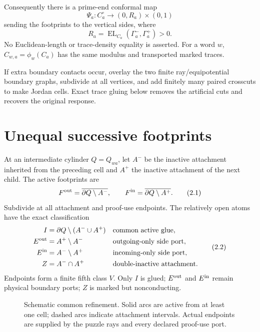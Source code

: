 \documentclass[11pt]{article}
\theoremstyle{definition}
\theoremstyle{remark}
\newcommand{\EL}{\operatorname{EL}}
\begin{document}
Consequently there is a prime-end conformal map
\[
 \Psi_a:C_a^\circ\longrightarrow(0,R_a)\times(0,1)
\]
sending the footprints to the vertical sides, where
\[
 R_a=\EL_{C_a}(\Gamma_a^-,\Gamma_a^+)>0.
 \tag{1.3}
\]
No Euclidean-length or trace-density equality is asserted.  For a word $w$,
$C_{w,a}=\phi_w(C_a)$ has the same modulus and transported marked traces.

If extra boundary contacts occur, overlay the two finite ray/equipotential
boundary graphs, subdivide at all vertices, and add finitely many paired
crosscuts to make Jordan cells.  Exact trace gluing below removes the artificial
cuts and recovers the original response.

\section{Unequal successive footprints}

At an intermediate cylinder $Q=Q_{wa}$, let $A^-$ be the inactive attachment
inherited from the preceding cell and $A^+$ the inactive attachment of the next
child.  The active footprints are
\[
 F^{\rm out}=\overline{\partial Q\setminus A^-},
 \qquad
 F^{\rm in}=\overline{\partial Q\setminus A^+}.
 \tag{2.1}
\]
Subdivide at all attachment and proof-use endpoints.  The relatively open atoms
have the exact classification
\[
\begin{aligned}
 I&=\partial Q\setminus(A^-\cup A^+) &&\text{common active glue},\\
 E^{\rm out}&=A^+\setminus A^- &&\text{outgoing-only side port},\\
 E^{\rm in}&=A^-\setminus A^+ &&\text{incoming-only side port},\\
 Z&=A^-\cap A^+ &&\text{double-inactive attachment}.
\end{aligned}
\tag{2.2}
\]
Endpoints form a finite fifth class $V$.  Only $I$ is glued; $E^{\rm out}$ and
$E^{\rm in}$ remain physical boundary ports; $Z$ is marked but nonconducting.

\begin{figure}[htbp]
\centering
{}
\caption{Schematic common refinement.  Solid arcs are active from at least one
cell; dashed arcs indicate attachment intervals.  Actual endpoints are supplied
by the puzzle rays and every declared proof-use port.}
\label{fig:refinement}
\end{figure}
\end{document}
